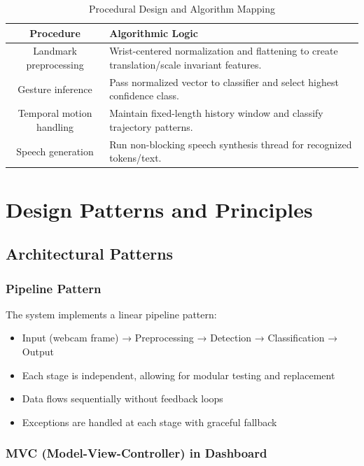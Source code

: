 \begin{table}[H]
\centering
\begin{tabular}{|c|p{}|}
\hline
\textbf{Procedure} & \textbf{Algorithmic Logic} \\
\hline
Landmark preprocessing & Wrist-centered normalization and flattening to create translation/scale invariant features. \\
\hline
Gesture inference & Pass normalized vector to classifier and select highest confidence class. \\
\hline
Temporal motion handling & Maintain fixed-length history window and classify trajectory patterns. \\
\hline
Speech generation & Run non-blocking speech synthesis thread for recognized tokens/text. \\
\hline
\end{tabular}
\caption{Procedural Design and Algorithm Mapping}
\end{table}

\section{Design Patterns and Principles}

\subsection{Architectural Patterns}

\subsubsection{Pipeline Pattern}

The system implements a linear pipeline pattern:
\begin{itemize}
    \item Input (webcam frame) → Preprocessing → Detection → Classification → Output
    \item Each stage is independent, allowing for modular testing and replacement
    \item Data flows sequentially without feedback loops
    \item Exceptions are handled at each stage with graceful fallback
\end{itemize}

\subsubsection{MVC (Model-View-Controller) in Dashboard}

